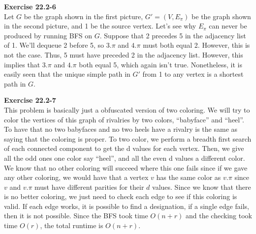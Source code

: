 \documentclass{article}
\begin{document}
\noindent\textbf{Exercise 22.2-6}\\

Let $G$ be the graph shown in the first picture, $G' = (V, E_\pi)$ be the graph shown in the second picture, and 1 be the source vertex.  Let's see why $E_\pi$ can never be produced by running BFS on $G$.  Suppose that 2 precedes 5 in the adjacency list of 1.  We'll dequeue 2 before 5, so $3.\pi$ and $4.\pi$ must both equal 2.  However, this is not the case.  Thus, 5 must have preceded 2 in the adjacency list.  However, this implies that $3.\pi$ and $4.\pi$ both equal 5, which again isn't true. Nonetheless, it is easily seen that the unique simple path in $G'$ from 1 to any vertex is a shortest path in $G$. \\



\noindent\textbf{Exercise 22.2-7}\\

This problem is basically just a obfuscated version of two coloring. We will try to color the vertices of this graph of rivalries by two colors, ``babyface'' and ``heel''. To have that no two babyfaces and no two heels have a rivalry is the same as saying that the coloring is proper. To two color, we perform a breadth first search of each connected component to get the d values for each vertex. Then, we give all the odd ones one color say ``heel'', and all the even d values a different color. We know that no other coloring will succeed where this one fails since if we gave any other coloring, we would have that a vertex $v$ has the same color as $v.\pi$ since $v$ and $v.\pi$ must have different parities for their $d$ values. Since we know that there is no better coloring, we just need to check each edge to see if this coloring is valid. If each edge works, it is possible to find a designation, if a single edge fails, then it is not possible. Since the BFS took time $O(n+r)$ and the checking took time $O(r)$, the total runtime is $O(n+r)$.\\
\end{document}
